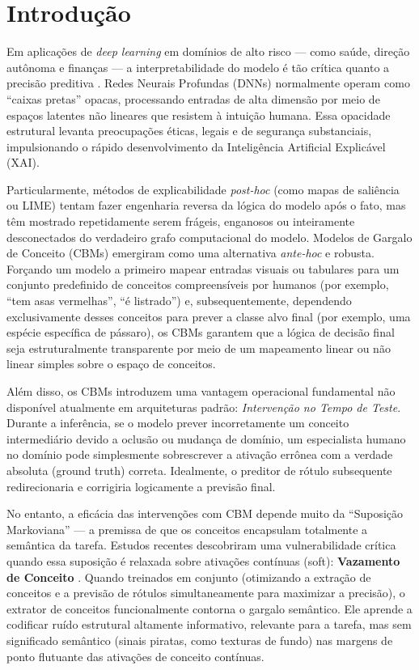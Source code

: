 \documentclass[times,twocolumn,final]{elsarticle}
\begin{document}

\section{Introdução}
\label{sec:intro}

Em aplicações de \textit{deep learning} em domínios de alto risco --- como saúde, direção autônoma e finanças --- a interpretabilidade do modelo é tão crítica quanto a precisão preditiva \citep{alvarez2018towards}. Redes Neurais Profundas (DNNs) normalmente operam como ``caixas pretas'' opacas, processando entradas de alta dimensão por meio de espaços latentes não lineares que resistem à intuição humana. Essa opacidade estrutural levanta preocupações éticas, legais e de segurança substanciais, impulsionando o rápido desenvolvimento da Inteligência Artificial Explicável (XAI).

Particularmente, métodos de explicabilidade \textit{post-hoc} (como mapas de saliência ou LIME) tentam fazer engenharia reversa da lógica do modelo após o fato, mas têm mostrado repetidamente serem frágeis, enganosos ou inteiramente desconectados do verdadeiro grafo computacional do modelo. Modelos de Gargalo de Conceito (CBMs) \citep{koh2020concept} emergiram como uma alternativa \textit{ante-hoc} e robusta. Forçando um modelo a primeiro mapear entradas visuais ou tabulares para um conjunto predefinido de conceitos compreensíveis por humanos (por exemplo, ``tem asas vermelhas'', ``é listrado'') e, subsequentemente, dependendo exclusivamente desses conceitos para prever a classe alvo final (por exemplo, uma espécie específica de pássaro), os CBMs garantem que a lógica de decisão final seja estruturalmente transparente por meio de um mapeamento linear ou não linear simples sobre o espaço de conceitos.

Além disso, os CBMs introduzem uma vantagem operacional fundamental não disponível atualmente em arquiteturas padrão: \textit{Intervenção no Tempo de Teste}. Durante a inferência, se o modelo prever incorretamente um conceito intermediário devido a oclusão ou mudança de domínio, um especialista humano no domínio pode simplesmente sobrescrever a ativação errônea com a verdade absoluta (ground truth) correta. Idealmente, o preditor de rótulo subsequente redirecionaria e corrigiria logicamente a previsão final.

No entanto, a eficácia das intervenções com CBM depende muito da ``Suposição Markoviana'' --- a premissa de que os conceitos encapsulam totalmente a semântica da tarefa. Estudos recentes descobriram uma vulnerabilidade crítica quando essa suposição é relaxada sobre ativações contínuas (soft): \textbf{Vazamento de Conceito} \citep{margeloi2021do, havasi2022addressing}. Quando treinados em conjunto (otimizando a extração de conceitos e a previsão de rótulos simultaneamente para maximizar a precisão), o extrator de conceitos funcionalmente contorna o gargalo semântico. Ele aprende a codificar ruído estrutural altamente informativo, relevante para a tarefa, mas sem significado semântico (sinais piratas, como texturas de fundo) nas margens de ponto flutuante das ativações de conceito contínuas.
\end{document}
